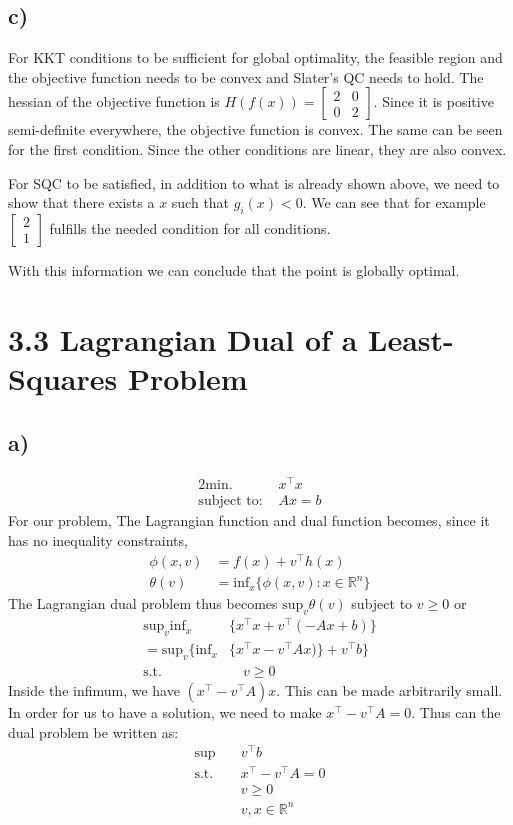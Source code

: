 \documentclass{article}
\begin{document}
\subsection*{c)}
	For KKT conditions to be sufficient for global optimality, the feasible region and the objective function needs to be convex and Slater's QC needs to hold.
	The hessian of the objective function is $H(f(x)) = \begin{bmatrix} 2 & 0 \\ 0 & 2 \end{bmatrix}$. Since it is positive semi-definite everywhere, the objective function is convex. The same can be seen for the first condition. Since the other conditions are linear, they are also convex. 
	
	For SQC to be satisfied, in addition to what is already shown above, we need to show that there exists a $x$ such that $g_i(x)<0$. We can see that for example $\begin{bmatrix}2 \\ 1\end{bmatrix}$ fulfills the needed condition for all conditions. 
	
	With this information we can conclude that the point is globally optimal.
\section*{3.3 Lagrangian Dual of a Least-Squares Problem}
\subsection*{a)}
	\begin{alignat}{2}
		\text{min. } & x^\top x \\
		\text{subject to: } & Ax=b	
	\end{alignat}
	For our problem, The Lagrangian function and dual function becomes, since it has no inequality constraints,
	\begin{align}
		\phi(x,v) &= f(x) + v^\top h(x)\\
		\theta(v) &= \text{inf}_x \{\phi(x,v): x\in \mathbb{R}^n\}
	\end{align}
	The Lagrangian dual problem thus becomes $\text{sup}_v\theta(v)$ subject to $v \geq 0$ or
	\begin{align}
		\text{sup}_v \text{inf}_x & \{x^\top x + v^\top(-Ax+b)\} \\
		= \text{sup}_v \{\text{inf}_x&  \{x^\top x - v^\top Ax)\} +v^\top b\} \\
		\text{s.t.} &\quad v \geq 0
	\end{align}
	Inside the infimum, we have $(x^\top - v^\top A)x$. This can be made arbitrarily small. In order for us to have a solution, we need to make $x^\top - v^\top A = 0$. Thus can the dual problem be written as:
	\begin{align}
		\text{sup} \quad & v^\top b \\
		\text{s.t.} \quad & x^\top - v^\top A = 0\\
		& v\geq 0\\
		& v,x \in \mathbb{R}^n
	\end{align}
\end{document}
